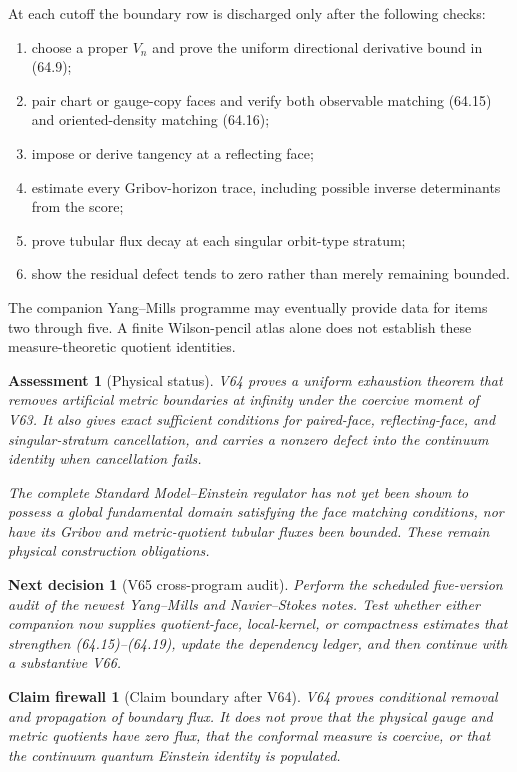 \documentclass[11pt]{article}
\newtheorem{firewall}[theorem]{Claim firewall}
\newtheorem{decision}[theorem]{Next decision}
\newtheorem{assessment}[theorem]{Assessment}
\theoremstyle{remark}
\begin{document}
At each cutoff the boundary row is discharged only after the
following checks:
\begin{enumerate}
\item choose a proper \(V_n\) and prove the uniform directional
      derivative bound in (64.9);
\item pair chart or gauge-copy faces and verify both observable
      matching (64.15) and oriented-density matching (64.16);
\item impose or derive tangency at a reflecting face;
\item estimate every Gribov-horizon trace, including possible
      inverse determinants from the score;
\item prove tubular flux decay at each singular orbit-type stratum;
\item show the residual defect tends to zero rather than merely
      remaining bounded.
\end{enumerate}

The companion Yang--Mills programme may eventually provide data
for items two through five.  A finite Wilson-pencil atlas alone
does not establish these measure-theoretic quotient identities.

\begin{assessment}[Physical status]
\label{ass:v15v64-status}
V64 proves a uniform exhaustion theorem that removes artificial
metric boundaries at infinity under the coercive moment of V63.
It also gives exact sufficient conditions for paired-face,
reflecting-face, and singular-stratum cancellation, and carries a
nonzero defect into the continuum identity when cancellation
fails.

The complete Standard Model--Einstein regulator has not yet been
shown to possess a global fundamental domain satisfying the face
matching conditions, nor have its Gribov and metric-quotient
tubular fluxes been bounded.  These remain physical construction
obligations.
\end{assessment}

\begin{decision}[V65 cross-program audit]
\label{dec:v15v64-next}
Perform the scheduled five-version audit of the newest
Yang--Mills and Navier--Stokes notes.  Test whether either companion
now supplies quotient-face, local-kernel, or compactness estimates
that strengthen (64.15)--(64.19), update the dependency ledger,
and then continue with a substantive V66.
\end{decision}

\begin{firewall}[Claim boundary after V64]
\label{fire:v15v64}
V64 proves conditional removal and propagation of boundary flux.
It does not prove that the physical gauge and metric quotients have
zero flux, that the conformal measure is coercive, or that the
continuum quantum Einstein identity is populated.
\end{firewall}
\end{document}
